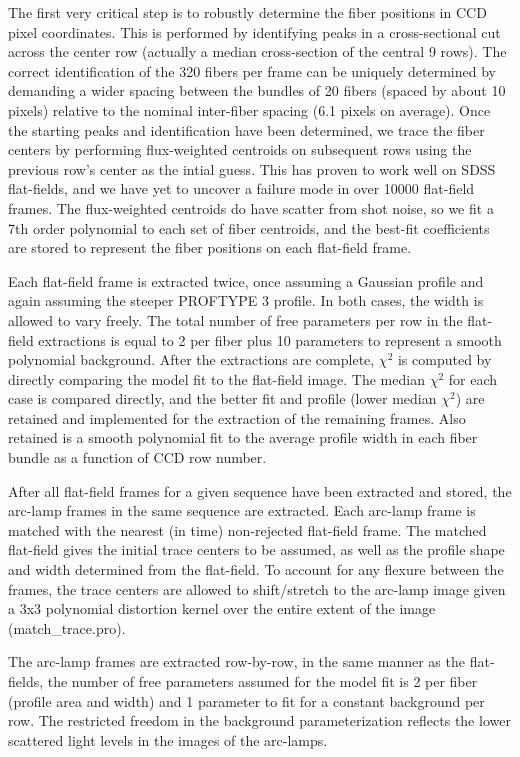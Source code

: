 \documentclass[12pt,preprint]{aastex}
\begin{document}
The first very critical step is to robustly determine the fiber positions 
in CCD pixel coordinates.
This is performed by identifying peaks in a cross-sectional cut across 
the center row (actually a median cross-section of the central 9 rows).  
The correct identification of the 320 fibers per frame can be 
uniquely determined by demanding a wider spacing between the bundles 
of 20 fibers (spaced by about 10 pixels) relative to the nominal inter-fiber 
spacing (6.1 pixels on average).  Once the starting peaks and 
identification have been determined, we trace the fiber centers 
by performing flux-weighted centroids on subsequent rows
using the previous row's center as the intial guess.  This has proven to 
work well on SDSS flat-fields, and we have yet to uncover a failure 
mode in over 10000 flat-field frames.
The flux-weighted centroids do have scatter from shot noise, 
so we fit a 7th order polynomial to each set of fiber centroids, 
and the best-fit coefficients are stored to represent the fiber positions 
on each flat-field frame.


Each flat-field frame is extracted twice, once assuming a Gaussian
profile and again assuming the steeper PROFTYPE 3 profile.  In both cases,
the width is allowed to vary freely.  The total number of free parameters
per row in the flat-field extractions is equal to 2 per fiber plus 10
parameters to represent a smooth polynomial background.  After the extractions
are complete, $\chi^2$ is computed by directly comparing the model fit
to the flat-field image.  The median $\chi^2$ for each case is compared
directly, and the better fit and profile (lower median $\chi^2$) are retained
and implemented for the extraction of the remaining frames.  Also retained
is a smooth polynomial fit to the average profile width in each fiber bundle
as a function of CCD row number.

After all flat-field frames for a given sequence have been extracted
and stored, the arc-lamp frames in the same sequence are extracted.  
Each arc-lamp frame is matched with the nearest (in time) 
non-rejected flat-field frame.  The matched flat-field gives the 
initial trace centers to
be assumed, as well as the profile shape and width determined from the
flat-field.  To account for any flexure between the frames, the trace
centers are allowed to shift/stretch to the arc-lamp image given a 
3x3 polynomial distortion kernel over the entire extent of the image
(match\_trace.pro).

The arc-lamp frames are extracted row-by-row, in the same
manner as the flat-fields, the number of free parameters assumed
for the model fit is 2 per fiber (profile area and width) and 1 parameter
to fit for a constant background per row.  The restricted freedom in the
background parameterization reflects the lower scattered light levels in
the images of the arc-lamps.
\end{document}
